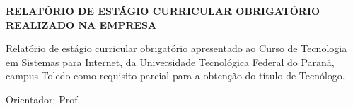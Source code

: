 \makeatletter


\begin{center}
	\large\textbf{\MakeUppercase{\@author}}
\end{center}

\vspace{6\baselineskip plus 1.5\baselineskip minus 0.5\baselineskip}

\begin{center}
	\large\textbf{RELATÓRIO DE ESTÁGIO CURRICULAR OBRIGATÓRIO REALIZADO NA EMPRESA \MakeUppercase{\@empresa}}
\end{center}

\vspace{10\baselineskip plus 1.5\baselineskip minus 0.5\baselineskip}


\begin{flushright}%
	\begin{minipage}{0.5\textwidth}%
		\hspace{1cm} Relatório de estágio curricular obrigatório apresentado ao Curso de Tecnologia em Sistemas para Internet, da Universidade Tecnológica Federal do Paraná, campus Toledo como requisito parcial para a obtenção do título de Tecnólogo.
	\end{minipage}
\end{flushright}

\vspace{1\baselineskip plus 1.5\baselineskip minus 0.5\baselineskip}

\begin{flushright}%
	\begin{minipage}{0.5\textwidth}%
		Orientador: Prof. \@profTitulo~\@orientador
	\end{minipage}
\end{flushright}

	\vfill%
\begin{center}
	\textbf{\MakeUppercase{\@cidade}}\\
	\anovalor
\end{center}

\restoregeometry %